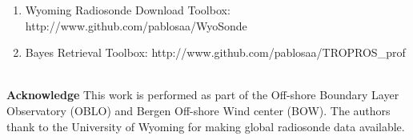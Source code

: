 \documentclass[landscape,paperwidth=1189mm,paperheight=841mm,fontscale=0.4,margin=.7cm]{baposter}
\begin{document}
\begin{poster}
{\begin{minipage}{0.99\linewidth}
{\begin{enumerate}
		\item \vspace{-0.4em} Wyoming Radiosonde Download Toolbox: http://www.github.com/pablosaa/WyoSonde
		\item \vspace{-0.4em} Bayes Retrieval Toolbox: http://www.github.com/pablosaa/TROPROS\_prof
	\end{enumerate}
}	
\vspace{-0.6em}
\end{minipage}\\
{\footnotesize
\textbf{Acknowledge} This work is performed as part of the Off-shore Boundary Layer Observatory (OBLO) and Bergen Off-shore Wind center (BOW). The authors thank to the University of Wyoming for making global radiosonde data available.}
}


\end{poster}
\end{document}
